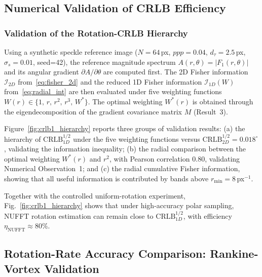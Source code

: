 \documentclass[lettersize,journal]{IEEEtran}
\newcommand{\CRLB}{\mathrm{CRLB}}
\newcommand{\bfM}{M}
\begin{document}
\subsection{Numerical Validation of CRLB Efficiency}
\label{sec:exp_crlb}

\subsubsection*{Validation of the Rotation-CRLB Hierarchy}

Using a synthetic speckle reference image ($N=64\,$px, $ppp=0.04$, $d_\tau=2.5\,$px, $\sigma_s=0.01$, seed=42), the reference magnitude spectrum $A(r,\theta)=|F_1(r,\theta)|$ and its angular gradient $\partial A/\partial\theta$ are computed first.
The 2D Fisher information $\mathcal{I}_{2D}$ from~\eqref{eq:fisher_2d} and the reduced 1D Fisher information $\mathcal{I}_{1D}(W)$ from~\eqref{eq:radial_int} are then evaluated under five weighting functions $W(r) \in \{1,\,r,\,r^2,\,r^3,\,W^*\}$.
The optimal weighting $W^*(r)$ is obtained through the eigendecomposition of the gradient covariance matrix $\bfM$ (Result~3).

Figure~\ref{fig:crlb1_hierarchy} reports three groups of validation results:
(a) the hierarchy of $\CRLB_{1D}^{1/2}$ under the five weighting functions versus $\CRLB_{2D}^{1/2}=0.018^\circ$, validating the information inequality;
(b) the radial comparison between the optimal weighting $W^*(r)$ and $r^2$, with Pearson correlation $0.80$, validating Numerical Observation~1;
and (c) the radial cumulative Fisher information, showing that all useful information is contributed by bands above $r_{\min}=8\,$px$^{-1}$.

Together with the controlled uniform-rotation experiment,
Fig.~\ref{fig:crlb1_hierarchy} shows that under high-accuracy polar sampling,
NUFFT rotation estimation can remain close to $\CRLB_{1D}^{1/2}$,
with efficiency $\eta_{\mathrm{NUFFT}}\approx 80\%$.

\subsection{Rotation-Rate Accuracy Comparison: Rankine-Vortex Validation}
\label{sec:exp_rotation}
\end{document}
